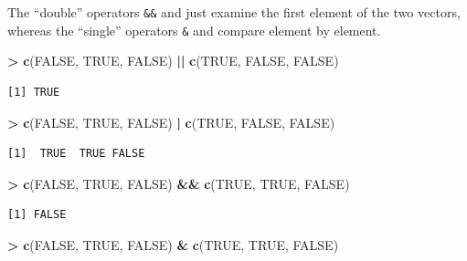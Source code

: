 \documentclass[]{krantz}
\makeatletter
\newenvironment{Shaded}{\begin{snugshade}}{\end{snugshade}}
\newcommand{\KeywordTok}[1]{\textcolor[rgb]{0.27,0.27,0.27}{\textbf{#1}}}
\newcommand{\NormalTok}[1]{#1}
\newcommand{\OperatorTok}[1]{\textcolor[rgb]{0.43,0.43,0.43}{\textbf{#1}}}
\newcommand{\OtherTok}[1]{\textcolor[rgb]{0.37,0.37,0.37}{#1}}
\newcommand{\StringTok}[1]{\textcolor[rgb]{0.5,0.5,0.5}{#1}}
\newenvironment{kframe}{%
\medskip{}
\setlength{\fboxsep}{.8em}
 \def\at@end@of@kframe{}%
 \ifinner\ifhmode%
  \def\at@end@of@kframe{\end{minipage}}%
  \begin{minipage}{\columnwidth}%
 \fi\fi%
 \def\FrameCommand##1{\hskip\@totalleftmargin \hskip-\fboxsep
 \colorbox{shadecolor}{##1}\hskip-\fboxsep
     \hskip-\linewidth \hskip-\@totalleftmargin \hskip\columnwidth}%
 \MakeFramed {\advance\hsize-\width
   \@totalleftmargin\z@ \linewidth\hsize
   \@setminipage}}%
 {\par\unskip\endMakeFramed%
 \at@end@of@kframe}
\renewenvironment{Shaded}{\begin{kframe}}{\end{kframe}}
\makeatother
\begin{document}
The ``double'' operators \texttt{\&\&} and \texttt{\textbar{}\textbar{}} just examine the first element of the two vectors, whereas the ``single'' operators \texttt{\&} and \texttt{\textbar{}} compare element by element.

\begin{Shaded}
\begin{Highlighting}[]
\OperatorTok{>}\StringTok{ }\KeywordTok{c}\NormalTok{(}\OtherTok{FALSE}\NormalTok{, }\OtherTok{TRUE}\NormalTok{, }\OtherTok{FALSE}\NormalTok{) }\OperatorTok{||}\StringTok{ }\KeywordTok{c}\NormalTok{(}\OtherTok{TRUE}\NormalTok{, }\OtherTok{FALSE}\NormalTok{, }\OtherTok{FALSE}\NormalTok{)}
\end{Highlighting}
\end{Shaded}

\begin{verbatim}
[1] TRUE
\end{verbatim}

\begin{Shaded}
\begin{Highlighting}[]
\OperatorTok{>}\StringTok{ }\KeywordTok{c}\NormalTok{(}\OtherTok{FALSE}\NormalTok{, }\OtherTok{TRUE}\NormalTok{, }\OtherTok{FALSE}\NormalTok{) }\OperatorTok{|}\StringTok{ }\KeywordTok{c}\NormalTok{(}\OtherTok{TRUE}\NormalTok{, }\OtherTok{FALSE}\NormalTok{, }\OtherTok{FALSE}\NormalTok{)}
\end{Highlighting}
\end{Shaded}

\begin{verbatim}
[1]  TRUE  TRUE FALSE
\end{verbatim}

\begin{Shaded}
\begin{Highlighting}[]
\OperatorTok{>}\StringTok{ }\KeywordTok{c}\NormalTok{(}\OtherTok{FALSE}\NormalTok{, }\OtherTok{TRUE}\NormalTok{, }\OtherTok{FALSE}\NormalTok{) }\OperatorTok{&&}\StringTok{ }\KeywordTok{c}\NormalTok{(}\OtherTok{TRUE}\NormalTok{, }\OtherTok{TRUE}\NormalTok{, }\OtherTok{FALSE}\NormalTok{)}
\end{Highlighting}
\end{Shaded}

\begin{verbatim}
[1] FALSE
\end{verbatim}

\begin{Shaded}
\begin{Highlighting}[]
\OperatorTok{>}\StringTok{ }\KeywordTok{c}\NormalTok{(}\OtherTok{FALSE}\NormalTok{, }\OtherTok{TRUE}\NormalTok{, }\OtherTok{FALSE}\NormalTok{) }\OperatorTok{&}\StringTok{ }\KeywordTok{c}\NormalTok{(}\OtherTok{TRUE}\NormalTok{, }\OtherTok{TRUE}\NormalTok{, }\OtherTok{FALSE}\NormalTok{)}
\end{Highlighting}
\end{Shaded}
\end{document}
